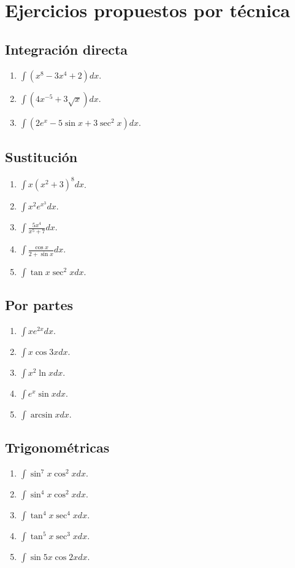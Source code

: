 \documentclass[12pt]{article}
\theoremstyle{definition}\newtheorem{definicion}[teorema]{Definición}\newtheorem{ejemplo}[teorema]{Ejemplo}\newtheorem{ejercicio}[teorema]{Ejercicio}
\theoremstyle{remark}\newtheorem*{observacion}{Observación}\newtheorem*{advertencia}{Advertencia}\newtheorem*{estrategia}{Estrategia}
\begin{document}
\section{Ejercicios propuestos por técnica}
\subsection*{Integración directa}
\begin{enumerate}
\item $\int(x^8-3x^4+2)dx$.
\item $\int(4x^{-5}+3\sqrt{x})dx$.
\item $\int(2e^x-5\sin x+3\sec^2x)dx$.
\end{enumerate}
\subsection*{Sustitución}
\begin{enumerate}
\item $\int x(x^2+3)^8dx$.
\item $\int x^2e^{x^3}dx$.
\item $\int\frac{5x^4}{x^5+7}dx$.
\item $\int\frac{\cos x}{2+\sin x}dx$.
\item $\int\tan x\sec^2x dx$.
\end{enumerate}
\subsection*{Por partes}
\begin{enumerate}
\item $\int xe^{2x}dx$.
\item $\int x\cos3x dx$.
\item $\int x^2\ln xdx$.
\item $\int e^x\sin xdx$.
\item $\int\arcsin xdx$.
\end{enumerate}
\subsection*{Trigonométricas}
\begin{enumerate}
\item $\int\sin^7x\cos^2xdx$.
\item $\int\sin^4x\cos^2xdx$.
\item $\int\tan^4x\sec^4xdx$.
\item $\int\tan^5x\sec^3xdx$.
\item $\int\sin5x\cos2xdx$.
\end{enumerate}
\end{document}
